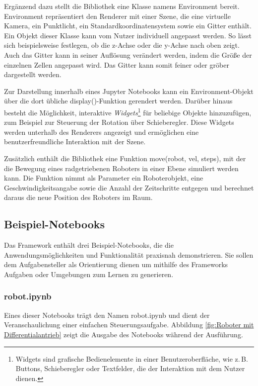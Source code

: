 Ergänzend dazu stellt die Bibliothek eine Klasse namens Environment bereit.
Environment repräsentiert den Renderer mit einer Szene, die eine virtuelle Kamera, ein Punktlicht,
ein Standardkoordinatensystem sowie ein Gitter enthält. Ein Objekt dieser Klasse kann vom Nutzer individuell angepasst werden.
So lässt sich beispielsweise festlegen, ob die z-Achse oder die y-Achse nach oben zeigt.
Auch das Gitter kann in seiner Auflösung verändert werden, indem die Größe der einzelnen Zellen angepasst wird.
Das Gitter kann somit feiner oder gröber dargestellt werden.

Zur Darstellung innerhalb eines Jupyter Notebooks kann ein Environment-Objekt über die dort übliche display()-Funktion gerendert werden.
Darüber hinaus besteht die Möglichkeit, interaktive \textit{Widgets}\footnote{Widgets sind grafische Bedienelemente in einer Benutzeroberfläche,
wie z.\,B. Buttons, Schieberegler oder Textfelder, die der Interaktion mit dem Nutzer dienen.} für beliebige Objekte hinzuzufügen, zum Beispiel zur Steuerung der Rotation über Schieberegler.
Diese Widgets werden unterhalb des Renderers angezeigt und ermöglichen eine benutzerfreundliche Interaktion mit der Szene.

Zusätzlich enthält die Bibliothek eine Funktion move(robot, vel, steps),
mit der die Bewegung eines radgetriebenen Roboters in einer Ebene simuliert werden kann.
Die Funktion nimmt als Parameter ein Roboterobjekt, eine Geschwindigkeitsangabe sowie die Anzahl der Zeitschritte entgegen und berechnet daraus die neue Position des Roboters im Raum.

\subsection{Beispiel-Notebooks}
Das Framework enthält drei Beispiel-Notebooks, die die Anwendungsmöglichkeiten und Funktionalität praxisnah demonstrieren.
Sie sollen dem Aufgabensteller als Orientierung dienen um mithilfe des Frameworks Aufgaben oder Umgebungen zum Lernen zu generieren.

\subsubsection{robot.ipynb}
Eines dieser Notebooks trägt den Namen robot.ipynb und dient der Veranschaulichung einer einfachen Steuerungsaufgabe.
Abbildung \ref{fig:Roboter mit Differentialantrieb} zeigt die Ausgabe des Notebooks während der Ausführung.
\vspace{1em}

